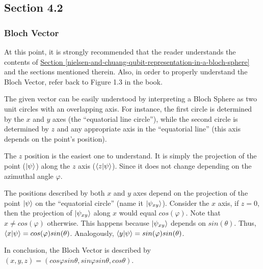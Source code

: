 \subsection{Section 4.2}
\subsubsection{Bloch Vector}

At this point, it is strongly recommended that the reader understands the contents of
\hyperref[nielsen-and-chuang-qubit-representation-in-a-bloch-sphere]{
    Section \ref{nielsen-and-chuang-qubit-representation-in-a-bloch-sphere}
} and the sections mentioned therein.
Also, in order to properly understand the Bloch Vector,
refer back to Figure 1.3 in the book.

The given vector can be easily understood by interpreting a Bloch Sphere
as two unit circles with an overlapping axis.
For instance, the first circle is determined by the $x$ and $y$ axes
(the ``equatorial line circle''),
while the second circle is determined by $z$ and any
appropriate axis in the ``equatorial line''
(this axis depends on the point's position).

The $z$ position is the easiest one to understand.
It is simply the projection of the point ($\ket \psi$) along the $z$ axis ($\mathop{\mathinner{ \langle{z}|{\psi}\rangle}}$).
Since it does not change depending on the azimuthal angle $\varphi$.

The positions described by both $x$ and $y$ axes depend on the projection
of the point $\ket \psi$ on the ``equatorial circle'' (name it $\ket{\psi_{xy}}$).
Consider the $x$ axis, if $z = 0$, then the projection of $\ket{\psi_{xy}}$
along $x$ would equal $cos(\varphi)$.
Note that $x \neq cos(\varphi)$ otherwise.
This happens because $\ket{\psi_{xy}}$ depends on $sin(\theta)$.
Thus, $\mathop{\mathinner{ \langle{x}|{\psi}\rangle}} = cos(\varphi) sin(\theta)$.
Analogously, $\mathop{\mathinner{ \langle{y}|{\psi}\rangle}} = sin(\varphi) sin(\theta)$.

In conclusion, the Bloch Vector is described by
$(x, y, z) = (cos\varphi sin\theta, sin\varphi sin\theta, cos\theta)$.